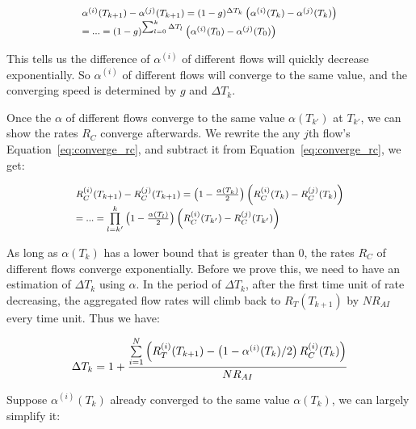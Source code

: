 \begin{equation}
\small
\begin{array}{l}
{\alpha ^{(i)}}({T_{k + 1}}) - {\alpha ^{(j)}}({T_{k + 1}}) = {(1 - g)^{\Delta {T_k}}}\left( {{\alpha ^{(i)}}({T_k}) - {\alpha ^{(j)}}({T_k})} \right)\\
 = ... = {(1 - g)^{\sum\nolimits_{l = 0}^k {\Delta {T_l}} }}\left( {{\alpha ^{(i)}}({T_0}) - {\alpha ^{(j)}}({T_0})} \right)
\end{array}
\end{equation}

This tells us the difference of $\alpha^{(i)}$ of different flows will quickly decrease exponentially. So $\alpha^{(i)}$
of different flows will converge to the same value, and the converging speed is determined by $g$ and
$\Delta T_k$. 

Once the $\alpha$ of different flows converge to the same value $\alpha(T_{k'})$ at $T_{k'}$, we can show 
the rates $R_C$ converge afterwards. We rewrite the any $j$th flow's Equation~\ref{eq:converge_rc}, and subtract it 
from Equation~\ref{eq:converge_rc}, we get:

\begin{equation}
\small
\begin{array}{l}
R_C^{(i)}({T_{k + 1}}) - R_C^{(j)}({T_{k + 1}}) = \left( {1 - \frac{{\alpha ({T_k})}}{2}} \right)\left( {R_C^{(i)}({T_k}) - R_C^{(j)}({T_k})} \right)\\
 = ... = \prod\limits_{l = k'}^k {\left( {1 - \frac{{\alpha ({T_l})}}{2}} \right)} \left( {R_C^{(i)}({T_{k'}}) - R_C^{(j)}({T_{k'}})} \right)
\end{array}
\label{eq:converge}
\end{equation}

As long as $\alpha ({T_k})$ has a lower bound that is greater than 0, the rates $R_C$ of different flows 
converge exponentially. Before we prove this, we need to have an estimation of $\Delta T_k$ using $\alpha$.
In the period of $\Delta T_k$, after the first time unit of rate decreasing, the aggregated flow rates
will climb back to $R_T(T_{k+1})$ by $NR_{AI}$ every time unit. Thus we have:

\begin{equation}
\small\Delta {T_k} = 1 + \frac{{\sum\limits_{i = 1}^N {\left( {R_T^{(i)}({T_{k + 1}}) - \left( {1 - {\alpha ^{(i)}}({T_k})/2} \right)R_C^{(i)}({T_k})} \right)} }}{{N{R_{AI}}}}
\end{equation}

Suppose $\alpha^{(i)}({T_k})$ already converged to the same value $\alpha ({T_k})$, we can largely simplify it:

